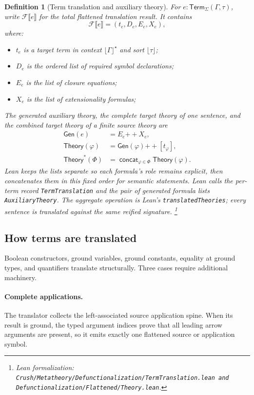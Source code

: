 \documentclass[11pt]{article}
\newtheorem{definition}{Definition}[section]
\theoremstyle{remark}
\newcommand{\leanfiles}[1]{\footnote{Lean formalization: \texttt{Crush/Metatheory/#1}.}}
\newcommand{\erase}[1]{\lfloor #1\rfloor}
\newcommand{\flattr}[1]{\mathcal F\llbracket #1\rrbracket}
\newcommand{\Gen}{\mathsf{Gen}}
\newcommand{\Theory}{\mathsf{Theory}}
\newcommand{\Theorys}[1]{\mathsf{Theory}^{\!*}(#1)}
\newcommand{\HOTerm}[4]{#3:\mathsf{Term}_{#1}(#2,#4)}
\begin{document}
\begin{definition}[Term translation and auxiliary theory]
For $\HOTerm{\Sigma}{\Gamma}{e}{\tau}$, write $\flattr{e}$ for the total
flattened translation result. It contains
\[
 \flattr{e}=(t_e,D_e,E_e,X_e),
\]
where:
\begin{itemize}[leftmargin=*]
 \item $t_e$ is a target term in context $\erase{\Gamma}^{\star}$ and sort
       $\erase{\tau}$;
 \item $D_e$ is the ordered list of required symbol declarations;
 \item $E_e$ is the list of closure equations;
 \item $X_e$ is the list of extensionality formulas;
\end{itemize}
The generated auxiliary theory, the complete target theory of one sentence,
and the combined target theory of a finite source theory are
\[
\begin{aligned}
 \Gen(e)&=E_e\mathbin{+\!+}X_e,\\
 \Theory(\varphi)&=\Gen(\varphi)\mathbin{+\!+}[t_\varphi],\\
 \Theorys{\Phi}&=
   \mathop{\mathsf{concat}}_{\varphi\in\Phi}\Theory(\varphi).
\end{aligned}
\]
Lean keeps the lists separate so each formula's role remains explicit, then
concatenates them in this fixed order for semantic statements. Lean calls the
per-term record \texttt{TermTranslation} and the pair of generated formula
lists \texttt{AuxiliaryTheory}. The aggregate operation is
Lean's
\texttt{translatedTheories}; every sentence is translated against the same
reified signature.
\leanfiles{Defunctionalization/TermTranslation.lean and Defunctionalization/Flattened/Theory.lean}
\end{definition}

\subsection{How terms are translated}

Boolean constructors, ground variables, ground constants, equality at ground
types, and quantifiers translate structurally. Three cases require additional
machinery.

\paragraph{Complete applications.}
The translator collects the left-associated source application spine. When its
result is ground, the typed argument indices prove that all leading arrow
arguments are present, so it emits exactly one flattened source or application
symbol.
\end{document}
